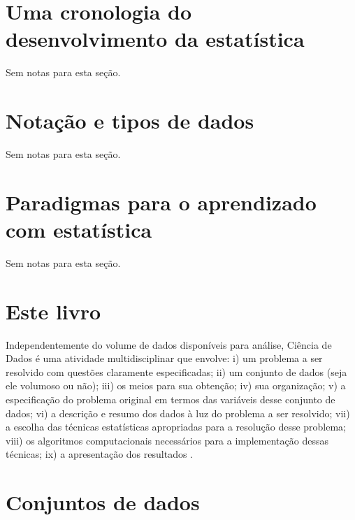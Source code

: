 \documentclass[
]{latex/krantz}
\renewenvironment{quote}{\begin{VF}}{\end{VF}}
\theoremstyle{definition}
\theoremstyle{definition}
\theoremstyle{definition}
\theoremstyle{definition}
\theoremstyle{remark}
\begin{document}
\hypertarget{uma-cronologia-do-desenvolvimento-da-estatuxedstica}{%
\section{Uma cronologia do desenvolvimento da estatística}\label{uma-cronologia-do-desenvolvimento-da-estatuxedstica}}

Sem notas para esta seção.

\hypertarget{notauxe7uxe3o-e-tipos-de-dados}{%
\section{Notação e tipos de dados}\label{notauxe7uxe3o-e-tipos-de-dados}}

Sem notas para esta seção.

\hypertarget{paradigmas-para-o-aprendizado-com-estatuxedstica}{%
\section{Paradigmas para o aprendizado com estatística}\label{paradigmas-para-o-aprendizado-com-estatuxedstica}}

Sem notas para esta seção.

\hypertarget{este-livro}{%
\section{Este livro}\label{este-livro}}

\begin{quote}
Independentemente do volume de dados disponíveis para análise, Ciência de Dados é uma atividade multidisciplinar que envolve: i) um problema a ser resolvido com questões claramente especificadas; ii) um conjunto de dados (seja ele volumoso ou não); iii) os meios para sua obtenção; iv) sua organização; v) a especificação do problema original em termos das variáveis desse conjunto de dados; vi) a descrição e resumo dos dados à luz do problema a ser resolvido; vii) a escolha das técnicas estatísticas apropriadas para a resolução desse problema; viii) os algoritmos computacionais necessários para a implementação dessas técnicas; ix) a apresentação dos resultados \citep[p.~11]{MorettinSinger2022}.
\end{quote}

\hypertarget{conjuntos-de-dados}{%
\section{Conjuntos de dados}\label{conjuntos-de-dados}}
\end{document}

